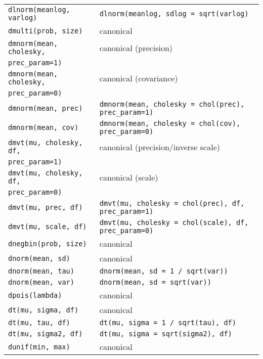 \begin{center}
\begin{longtable}{ll}
     \texttt{dlnorm(meanlog, varlog)} & \verb|dlnorm(meanlog, sdlog = sqrt(varlog)| \\
     \texttt{dmulti(prob, size)} & canonical \\
     \texttt{dmnorm(mean, cholesky, } & canonical (precision) \\
       \hspace{5mm}\texttt{prec\_param=1)}          & \\
     \texttt{dmnorm(mean, cholesky, } & canonical (covariance) \\
       \hspace{5mm}\texttt{prec\_param=0)}          & \\
    \texttt{dmnorm(mean, prec)} & \texttt{dmnorm(mean, cholesky = chol(prec), prec\_param=1)} \\
     \texttt{dmnorm(mean, cov)} & \texttt{dmnorm(mean, cholesky = chol(cov), prec\_param=0)} \\
     \texttt{dmvt(mu, cholesky, df, } & canonical (precision/inverse scale) \\
       \hspace{5mm}\texttt{prec\_param=1)}          & \\
     \texttt{dmvt(mu, cholesky, df, } & canonical (scale) \\
       \hspace{5mm}\texttt{prec\_param=0)}          & \\
     \texttt{dmvt(mu, prec, df)} & \texttt{dmvt(mu, cholesky = chol(prec), df, prec\_param=1)} \\
     \texttt{dmvt(mu, scale, df)} & \texttt{dmvt(mu, cholesky = chol(scale), df, prec\_param=0)} \\
   \texttt{dnegbin(prob, size)} & canonical \\
     \texttt{dnorm(mean, sd)} & canonical \\
     \texttt{dnorm(mean, tau)} & \verb|dnorm(mean, sd = 1 / sqrt(var))| \\
     \texttt{dnorm(mean, var)} & \texttt{dnorm(mean, sd = sqrt(var))} \\
     \texttt{dpois(lambda)} & canonical \\
     \texttt{dt(mu, sigma, df)} & canonical \\
    \texttt{dt(mu, tau, df)} & \verb|dt(mu, sigma = 1 / sqrt(tau), df)| \\
    \texttt{dt(mu, sigma2, df)} & \verb|dt(mu, sigma = sqrt(sigma2), df)| \\
   \texttt{dunif(min, max)} & canonical \\

\end{longtable}
\end{center}
